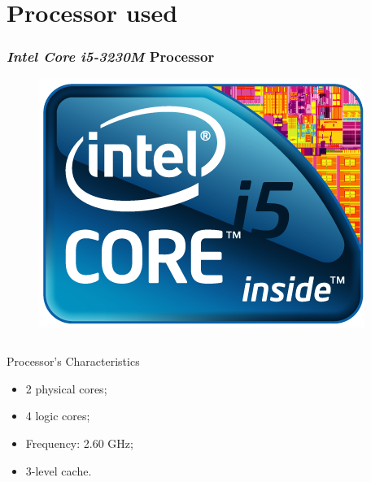 \documentclass{beamer}
\begin{document}
\section{Processor used}
\begin{frame}
	\frametitle{\emph{Intel Core i5-3230M} Processor}
	\begin{figure}
		\centering
		\includegraphics[scale=0.2]{intel_i5.png}
	\end{figure}
	\begin{columns}
		\begin{block}{Processor's Characteristics}
			\begin{itemize}
				\item 2 physical cores;
				\item 4 logic cores;
				\item Frequency: 2.60 GHz;
				\item 3-level cache.
			\end{itemize}
		\end{block}
	\end{columns}
\end{frame}
\end{document}
